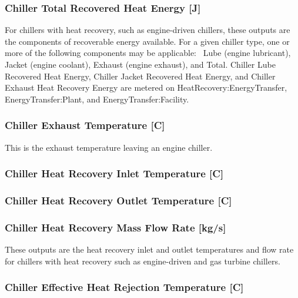 \subsubsection{Chiller Total Recovered Heat Energy {[}J{]}}\label{chiller-total-recovered-heat-energy-j}

For chillers with heat recovery, such as engine-driven chillers, these outputs are the components of recoverable energy available. For a given chiller type, one or more of the following components may be applicable:~ Lube (engine lubricant), Jacket (engine coolant), Exhaust (engine exhaust), and Total. Chiller Lube Recovered Heat Energy, Chiller Jacket Recovered Heat Energy, and Chiller Exhaust Heat Recovery Energy are metered on HeatRecovery:EnergyTransfer, EnergyTransfer:Plant, and EnergyTransfer:Facility.

\subsubsection{Chiller Exhaust Temperature {[}C{]}}\label{chiller-exhaust-temperature-c}

This is the exhaust temperature leaving an engine chiller.

\subsubsection{Chiller Heat Recovery Inlet Temperature {[}C{]}}\label{chiller-heat-recovery-inlet-temperature-c}

\subsubsection{Chiller Heat Recovery Outlet Temperature {[}C{]}}\label{chiller-heat-recovery-outlet-temperature-c}

\subsubsection{Chiller Heat Recovery Mass Flow Rate {[}kg/s{]}}\label{chiller-heat-recovery-mass-flow-rate-kgs}

These outputs are the heat recovery inlet and outlet temperatures and flow rate for chillers with heat recovery such as engine-driven and gas turbine chillers.

\subsubsection{Chiller Effective Heat Rejection Temperature {[}C{]}}\label{chiller-effective-heat-rejection-temperature-c}

